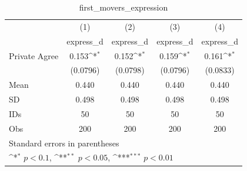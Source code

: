 \begin{table}[htbp]\centering
\def\sym#1{\ifmmode^{#1}\else\(^{#1}\)\fi}
\caption{first\_movers\_expression}
\begin{tabular}{l*{4}{c}}
\hline\hline
                                &\multicolumn{1}{c}{(1)}&\multicolumn{1}{c}{(2)}&\multicolumn{1}{c}{(3)}&\multicolumn{1}{c}{(4)}\\
                                &\multicolumn{1}{c}{express\_d}&\multicolumn{1}{c}{express\_d}&\multicolumn{1}{c}{express\_d}&\multicolumn{1}{c}{express\_d}\\
\hline
Private Agree                   &    0.153\sym{*}  &    0.152\sym{*}  &    0.159\sym{*}  &    0.161\sym{*}  \\
                                & (0.0796)         & (0.0798)         & (0.0796)         & (0.0833)         \\
\hline
Mean                            &    0.440         &    0.440         &    0.440         &    0.440         \\
SD                              &    0.498         &    0.498         &    0.498         &    0.498         \\
IDs                             &       50         &       50         &       50         &       50         \\
Obs                             &      200         &      200         &      200         &      200         \\
\hline\hline
\multicolumn{5}{l}{\footnotesize Standard errors in parentheses}\\
\multicolumn{5}{l}{\footnotesize \sym{*} \(p<0.1\), \sym{**} \(p<0.05\), \sym{***} \(p<0.01\)}\\
\end{tabular}
\end{table}
